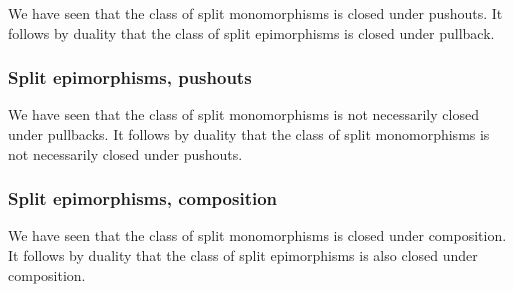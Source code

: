 We have seen that the class of split monomorphisms is closed under pushouts.
It follows by duality that the class of split epimorphisms is closed under pullback.



\subsubsection*{Split epimorphisms, pushouts}

We have seen that the class of split monomorphisms is not necessarily closed under pullbacks.
It follows by duality that the class of split monomorphisms is not necessarily closed under pushouts.



\subsubsection*{Split epimorphisms, composition}

We have seen that the class of split monomorphisms is closed under composition.
It follows by duality that the class of split epimorphisms is also closed under composition.
